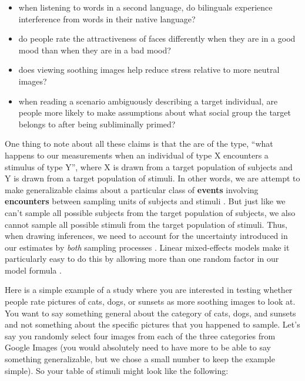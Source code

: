 \documentclass[]{book}
\providecommand{\tightlist}{%
  \setlength{\itemsep}{0pt}\setlength{\parskip}{0pt}}
\begin{document}
\begin{itemize}
\tightlist
\item
  when listening to words in a second language, do bilinguals experience interference from words in their native language?
\item
  do people rate the attractiveness of faces differently when they are in a good mood than when they are in a bad mood?
\item
  does viewing soothing images help reduce stress relative to more neutral images?
\item
  when reading a scenario ambiguously describing a target individual, are people more likely to make assumptions about what social group the target belongs to after being subliminally primed?
\end{itemize}

One thing to note about all these claims is that the are of the type, ``what happens to our measurements when an individual of type X encounters a stimulus of type Y'', where X is drawn from a target population of subjects and Y is drawn from a target population of stimuli. In other words, we are attempt to make generalizable claims about a particular class of \textbf{events} involving \textbf{encounters} between sampling units of subjects and stimuli \citep{Barr_2017}. But just like we can't sample all possible subjects from the target population of subjects, we also cannot sample all possible stimuli from the target population of stimuli. Thus, when drawing inferences, we need to account for the uncertainty introduced in our estimates by \emph{both} sampling processes \citep{Coleman_1964, Clark_1973, Judd_Westfall_Kenny_2012, yarkoni_2019}. Linear mixed-effects models make it particularly easy to do this by allowing more than one random factor in our model formula \citep{Baayen_Davidson_Bates_2008}.

Here is a simple example of a study where you are interested in testing whether people rate pictures of cats, dogs, or sunsets as more soothing images to look at. You want to say something general about the category of cats, dogs, and sunsets and not something about the specific pictures that you happened to sample. Let's say you randomly select four images from each of the three categories from Google Images (you would absolutely need to have more to be able to say something generalizable, but we chose a small number to keep the example simple). So your table of stimuli might look like the following:
\end{document}
